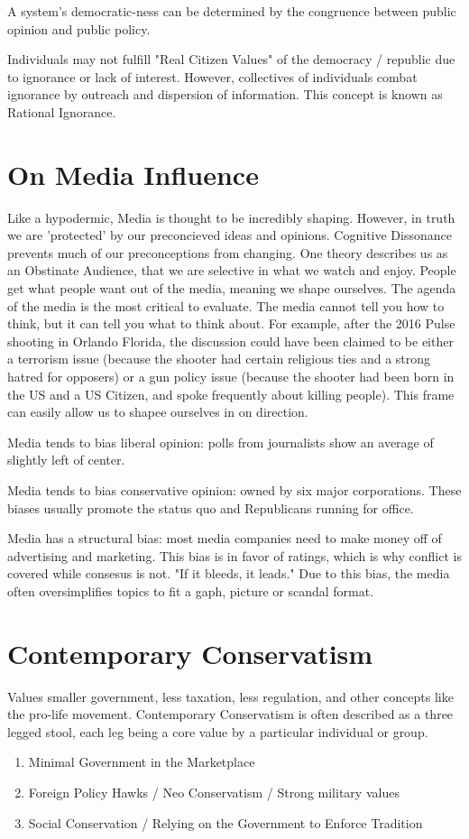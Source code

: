 \documentclass{article}
\begin{document}
A system's democratic-ness can be determined by the congruence between public opinion and public policy.

Individuals may not fulfill "Real Citizen Values" of the democracy / republic due to ignorance or lack of interest. However, collectives of individuals combat ignorance by outreach and dispersion of information. This concept is known as Rational Ignorance.

\section{On Media Influence}
Like a hypodermic, Media is thought to be incredibly shaping. However, in truth we are 'protected' by our preconcieved ideas and opinions. Cognitive Dissonance prevents much of our preconceptions from changing. One theory describes us as an Obstinate Audience, that we are selective in what we watch and enjoy. People get what people want out of the media, meaning we shape ourselves. The agenda of the media is the most critical to evaluate. The media cannot tell you how to think, but it can tell you what to think about. For example, after the 2016 Pulse shooting in Orlando Florida, the discussion could have been claimed to be either a terrorism issue (because the shooter had certain religious ties and a strong hatred for opposers) or a gun policy issue (because the shooter had been born in the US and a US Citizen, and spoke frequently about killing people). This frame can easily allow us to shapee ourselves in on direction.

Media tends to bias liberal opinion: polls from journalists show an average of slightly left of center.

Media tends to bias conservative opinion: owned by six major corporations. These biases usually promote the status quo and Republicans running for office.

Media has a structural bias: most media companies need to make money off of advertising and marketing. This bias is in favor of ratings, which is why conflict is covered while consesus is not. "If it bleeds, it leads." Due to this bias, the media often oversimplifies topics to fit a gaph, picture or scandal format.

\section{Contemporary Conservatism}
Values smaller government, less taxation, less regulation, and other concepts like the pro-life movement. Contemporary Conservatism is often described as a three legged stool, each leg being a core value by a particular individual or group.
\begin{enumerate}
  \item Minimal Government in the Marketplace
  \item Foreign Policy Hawks / Neo Conservatism / Strong military values
  \item Social Conservation / Relying on the Government to Enforce Tradition
\end{enumerate}
\end{document}
